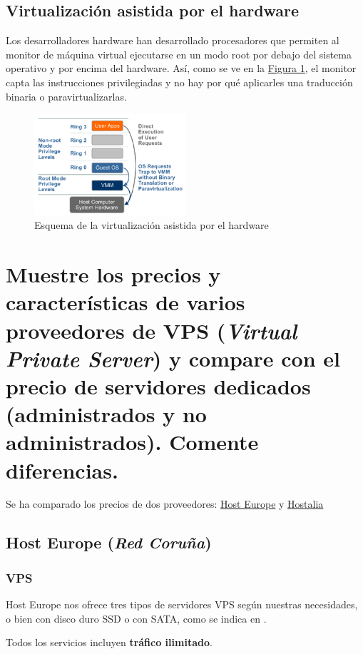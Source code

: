 \documentclass[10pt,a4paper,spanish]{article}
\numberwithin{equation}{section} %
\numberwithin{figure}{section} %
\numberwithin{table}{section} %
\begin{document}
\subsection{Virtualización asistida por el hardware}
Los desarrolladores hardware han desarrollado procesadores que permiten al monitor de máquina virtual ejecutarse en un modo root por debajo del sistema operativo y por encima del hardware. Así, como se ve en la \hyperref[virast]{Figura \ref*{virast}}, el monitor capta las instrucciones privilegiadas y no hay por qué aplicarles una traducción binaria o paravirtualizarlas.

\begin{figure}[!h]
\centering
\includegraphics[width=0.5\textwidth]{3}
\caption{Esquema de la virtualización asistida por el hardware}
\label{virast}
\end{figure}

\section{Muestre los precios y características de varios proveedores de VPS (\textit{Virtual Private Server}) y compare con el precio de servidores dedicados (administrados y no administrados). Comente diferencias.}
Se ha comparado los precios de dos proveedores: \href{https://www.hosteurope.es/}{Host Europe} y \href{http://www.hostalia.com/}{Hostalia}

\subsection{Host Europe (\textit{Red Coruña})}
\subsubsection{VPS}
Host Europe nos ofrece tres tipos de servidores VPS según nuestras necesidades, o bien con disco duro SSD o con SATA, como se indica en \cite{hevps}.

Todos los servicios incluyen \textbf{tráfico ilimitado}.
\end{document}
